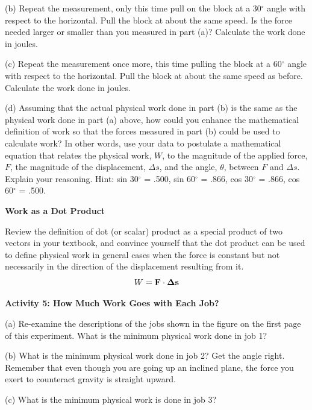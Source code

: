 \newpage
(b) Repeat the measurement, only this time pull on the block at a 30\( ^{\circ } \) angle with respect to the horizontal. Pull the block at about the same speed. Is the force needed larger or smaller than you measured in part (a)? Calculate the work done in joules.
\vspace{20mm}

(c) Repeat the measurement once more, this time pulling the block at a 60\( ^{\circ } \) angle with respect to the horizontal.  Pull the block at about the same speed as before. Calculate the work 
done in joules.
\vspace{20mm}

(d) Assuming that the actual physical work done in part (b) is the same as the
physical work done in part (a) above, how could you enhance the mathematical
definition of work so that the forces measured in part (b) could be used to
calculate work? In other words, use your data to postulate a mathematical equation
that relates the physical work, $W$, to the magnitude of the applied force, $F$,
the magnitude of the displacement, \( \Delta  s\), and the angle, \( \theta  \),
between $F$ and \( \Delta  s\). Explain your reasoning. Hint: sin 30\( ^{\circ } \)
= .500, sin 60\( ^{\circ } \) = .866, cos 30\( ^{\circ } \) = .866, cos 60\( ^{\circ } \)
= .500.
\vspace{30mm}

\textbf{Work as a Dot Product }

Review the definition of dot (or scalar) product as a special product of two
vectors in your textbook, and convince yourself that the dot product can be
used to define physical work in general cases when the force is constant but
not necessarily in the direction of the displacement resulting from it. 
\[W={\bf F}\cdot {\bf \Delta s}\]


\textbf{Activity 5: How Much Work Goes with Each Job? }

(a) Re-examine the descriptions of the jobs shown in the figure on the first
page of this experiment. What is the minimum physical work done in job 1?
\vspace{20mm}

(b) What is the minimum physical work done in job 2? Get the angle right. 
Remember that even though you are going up an inclined plane, the force you 
exert to counteract gravity is straight upward.
\answerspace{25mm}


\pagebreak[2]
(c) What is the minimum physical work is done in job 3?
\answerspace{25mm}

